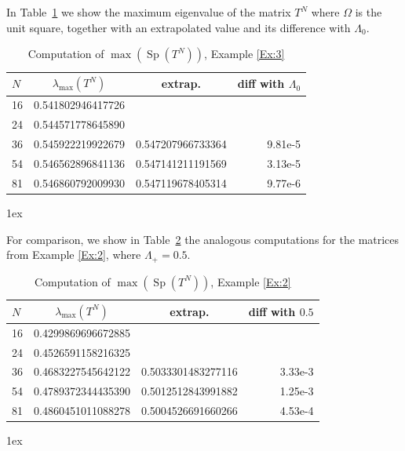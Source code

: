 \documentclass[12pt]{amsart}
\theoremstyle{definition}
\theoremstyle{remark}
\numberwithin{equation}{section}
\newcommand{\Sp}{\mathop{\mathrm{Sp}}\nolimits}
\begin{document}
In Table~\ref{T:maxEv} we show the maximum eigenvalue of the matrix $T^{N}$ where $\Omega$ is the unit square, together with an extrapolated value and its difference with $\Lambda_{0}$. 
\begin{table}[htbp]
   \centering
    \begin{tabular}{@{} lccr @{}} %
      \toprule
      $N$    &  $\lambda_{\max}(T^{N})$ & extrap. & diff with $\Lambda_{0}$\\
      \midrule
16 & 0.541802946417726 &  &\\
24 & 0.544571778645890 &  & \\
36 & 0.545922219922679 &  0.547207966733364 & 9.81e-5\\
54 & 0.546562896841136 & 0.547141211191569 & 3.13e-5\\
81 & 0.546860792009930 & 0.547119678405314 & 9.77e-6\\
      \bottomrule
   \end{tabular}\vglue1ex
   \caption{Computation of $\max(\Sp(T^{N}))$, Example \ref{Ex:3}}
   \label{T:maxEv}
\end{table}

For comparison, we show in Table~\ref{T:maxEvEx2} the analogous computations for the matrices from Example \ref{Ex:2}, where $\Lambda_{+}=0.5$.
\begin{table}[htbp]
   \centering
    \begin{tabular}{@{} lccr @{}} %
      \toprule
      $N$    &  $\lambda_{\max}(T^{N})$ & extrap. & diff with $0.5$\\
      \midrule
16 & 0.4299869696672885 &  &\\
24 & 0.4526591158216325 &  & \\
36 & 0.4683227545642122 &  0.5033301483277116 & 3.33e-3\\
54 & 0.4789372344435390 & 0.5012512843991882 & 1.25e-3\\
81 & 0.4860451011088278 & 0.5004526691660266 & 4.53e-4\\
      \bottomrule
   \end{tabular}\vglue1ex
   \caption{Computation of $\max(\Sp(T^{N}))$, Example \ref{Ex:2}}
   \label{T:maxEvEx2}
\end{table}
\end{document}
